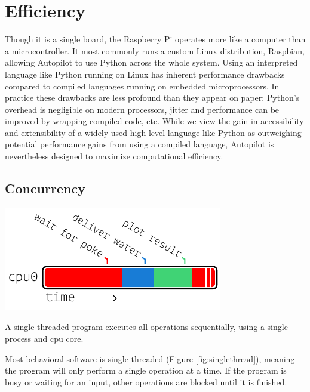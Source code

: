 \section{Efficiency}
\label{sec:efficiency}

Though it is a single board, the Raspberry Pi operates more like a computer than a microcontroller. It most commonly runs a custom Linux distribution, Raspbian, allowing Autopilot to use Python across the whole system. Using an interpreted language like Python running on Linux has inherent performance drawbacks compared to compiled languages running on embedded microprocessors. In practice these drawbacks are less profound than they appear on paper: Python's overhead is negligible on modern processors, jitter and performance can be improved by wrapping \hyperref[sec:lowlevel]{compiled code}, etc. While we view the gain in accessibility and extensibility of a widely used high-level language like Python as outweighing potential performance gains from using a compiled language, Autopilot is nevertheless designed to maximize computational efficiency.

\subsection{Concurrency}

\begin{marginfigure}[2cm]
\includegraphics[]{figures/side_12_onethread.pdf}
\caption{A single-threaded program executes all operations sequentially, using a single process and cpu core.}
\label{fig:singlethread}
\end{marginfigure}

Most behavioral software is single-threaded (Figure \ref{fig:singlethread}), meaning the program will only perform a single operation at a time. If the program is busy or waiting for an input, other operations are blocked until it is finished.


